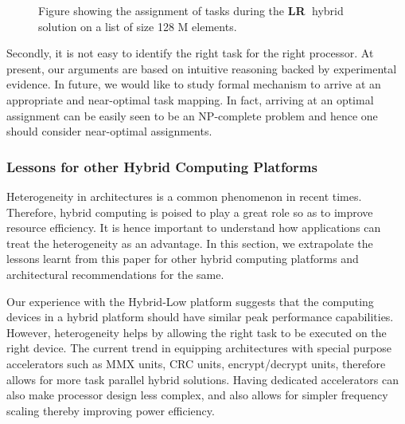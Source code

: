 \documentclass[11pt]{article}
\newcommand{\ignore}[1] {}
\newcommand{\LR} {{\bf LR}}
\begin{document}
\begin{figure}
\centering
{}
\caption{Figure showing the assignment of tasks during the \LR$\;$ hybrid
solution on a list of size 128 M elements.}
\label{fig:LRwork}
\end{figure}

Secondly, it is not easy to identify the right task for the right
processor. At present, our arguments are based on intuitive reasoning backed
by experimental evidence. In future, we would like to study
formal mechanism to arrive at an appropriate and near-optimal task mapping.
In fact, arriving at an optimal assignment can be easily seen to be an
NP-complete problem and hence one should consider near-optimal
assignments.



\ignore {
\subsubsection{Programming Models}

Hybrid computing requires a significant reinterpretation of programs to
achieve performance improvements.  Current programming models offer
little support for writing hybrid programs. In all the workloads that we
implemented for this study, we used OpenMP \cite{openmp} and the CUDA
programming model for programming mutlicore CPUs and NVIDIA GPUs
respectively. In light of this, it is important that the gains in
efficiency offset the programming effort involved in writing hybrid
programs. This also suggests that one should consider developing
appropriate programming models that ease the programming effort on
hybrid computing platforms.
}


\subsubsection{Lessons for other Hybrid Computing Platforms}
Heterogeneity in architectures is a common phenomenon in
recent times. Therefore, hybrid computing is poised to
play a great role so as to improve resource efficiency. It is hence
important to understand how applications can treat
the heterogeneity as an advantage. In this section,
we extrapolate the lessons learnt from this paper for other hybrid
computing platforms and architectural recommendations for the same.

Our experience with the Hybrid-Low platform suggests that the computing
devices in a hybrid platform should have similar peak performance
capabilities. However, heterogeneity helps by allowing the right task to
be executed on the right device. The current trend in equipping
architectures with special purpose accelerators such as MMX units, CRC
units, encrypt/decrypt units, therefore allows for more task parallel
hybrid solutions. 
Having dedicated accelerators can also make processor design less
complex, and also allows for simpler frequency scaling thereby improving 
power efficiency.
\end{document}
